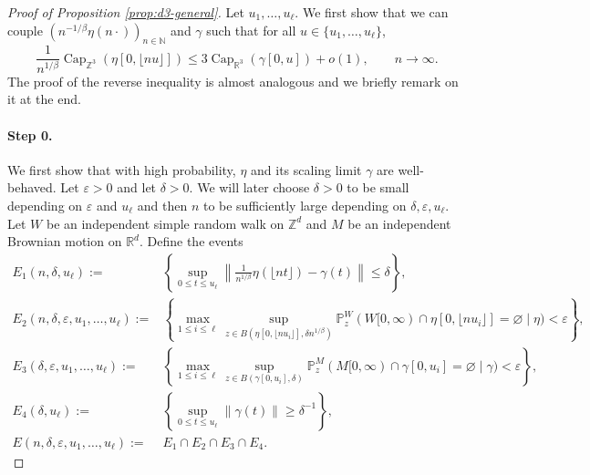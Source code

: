 \documentclass{article}
\DeclareMathOperator{\Ca}{Cap}
\newcommand{\R}{\mathbb{R}}
\newcommand{\Z}{\mathbb{Z}}
\newcommand{\N}{\mathbb{N}}
\renewcommand{\P}{\mathbb{P}}
\newcommand{\1}{\mathbf{1}}
\theoremstyle{definition}
\numberwithin{equation}{section}
\numberwithin{theorem}{section}
\begin{document}
\begin{proof}[Proof of Proposition \ref{prop:d3-general}]
Let $u_1,\ldots,u_{\ell}$. We first show that we can couple $(n^{-1/\beta}\eta(n\cdot))_{n\in\N}$ and $\gamma$ such that for all $u\in\{u_1,\ldots,u_\ell\}$,
\begin{equation}\label{eq:lln3dupperbound}
    \frac{1}{n^{1/\beta}}\Ca_{\Z^3}(\eta[0,\lfloor n u\rfloor])\leq3\Ca_{\R^3}(\gamma[0,u])+o(1),\qquad n\rightarrow\infty.
\end{equation}
The proof of the reverse inequality is almost analogous and we briefly remark on it at the end.



\paragraph{Step 0.}
We first show that with high probability, $\eta$ and its scaling limit $\gamma$ are well-behaved. Let $\varepsilon>0$ and let $\delta>0$. We will later choose $\delta>0$ to be small depending on $\varepsilon$ and $u_{\ell}$ and then $n$ to be sufficiently large depending on $\delta,\varepsilon,u_{\ell}$. Let $W$ be an independent simple random walk on $\Z^d$ and $M$ be an independent Brownian motion on $\R^d$. Define the events
\begin{equation}
    \begin{split}
        E_1(n,\delta,u_{\ell}):=&\left\{\sup_{0\leq t\leq u_{\ell}}\left\|\frac{1}{n^{1/\beta}}\eta(\lfloor n t\rfloor)-\gamma(t)\right\|\leq\delta\right\},\\
        E_2(n,\delta,\varepsilon,u_1,\ldots,u_{\ell}):=&\left\{\max_{1\leq i\leq \ell}\sup_{z\in B(\eta[0,\lfloor nu_i\rfloor],\delta n^{1/\beta})}\P^W_z(W[0,\infty)\cap \eta[0,\lfloor nu_i\rfloor]=\varnothing\mid \eta)<\varepsilon\right\},\\
        E_3(\delta,\varepsilon,u_1,\ldots,u_{\ell}):=&\left\{\max_{1\leq i\leq\ell}\sup_{z\in B(\gamma[0,u_i],\delta)}\P^M_z(M[0,\infty)\cap \gamma[0,u_i]=\varnothing\mid \gamma)<\varepsilon\right\},\\
        E_4(\delta,u_{\ell}):=&\left\{\sup_{0\leq t\leq u_{\ell}}\|\gamma(t)\|\geq\delta^{-1}\right\},\\
        E(n,\delta,\varepsilon,u_1,\ldots,u_{\ell}):=&E_1\cap E_2\cap E_3\cap E_4.
    \end{split}
\end{equation}

\end{proof}
\end{document}
